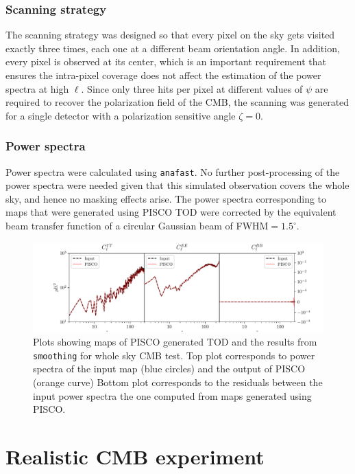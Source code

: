 \documentclass[a4paper,11pt]{article}
\begin{document}
\subsubsection{Scanning strategy}

The scanning strategy was designed so that every pixel on the sky gets visited exactly three times, each one at a different beam orientation angle. In addition, every pixel is observed at its center, which is an important requirement that ensures the intra-pixel coverage does not affect the estimation of the power spectra at high $\ell$. Since only three hits per pixel at different values of $\psi$ are required to recover the polarization field of the CMB, the scanning was generated for a single detector with a polarization sensitive angle $\zeta=0$.

\subsubsection{Power spectra}

Power spectra were calculated using \texttt{anafast}. No further post-processing of the power spectra were needed given that this simulated observation covers the whole sky, and hence no masking effects arise. The power spectra corresponding to maps that were generated using PISCO TOD were corrected by the equivalent beam transfer function of a circular Gaussian beam of FWHM$=1.5^\circ$. 

\begin{figure}
	\centering
	\includegraphics[width=1\linewidth]{figures/cmb_r0d00_CLASS_wholeskytest.pdf}
	\caption{Plots showing maps of PISCO generated TOD and the results from \texttt{smoothing} for whole sky CMB test. Top plot corresponds to power spectra of the input map (blue circles) and the output of PISCO (orange curve) Bottom plot corresponds to the residuals between the input power spectra the one computed from maps generated using PISCO.}
	\label{fig::pisco4wholesky}
\end{figure}

%
\section{Realistic CMB experiment}
\label{sec::realistic_cmb_experiment}
\end{document}
